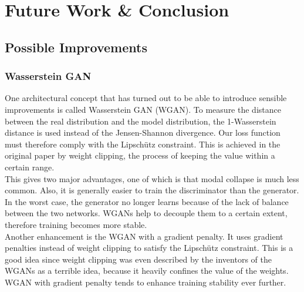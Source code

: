 \section{Future Work \& Conclusion}

	\subsection{Possible Improvements}
	
	\subsubsection{Wasserstein GAN}
	One architectural concept that has turned out to be able to introduce sensible improvements is called Wasserstein GAN (WGAN)\cite{arjovsky2017wasserstein}. To measure the distance between the real distribution and the model distribution, the 1-Wasserstein distance is used instead of the Jensen-Shannon divergence. Our loss function must therefore comply with the Lipschütz constraint. This is achieved in the original paper by weight clipping, the process of keeping the value within a certain range. \\
	This gives two major advantages, one of which is that modal collapse is much less common. Also, it is generally easier to train the discriminator than the generator. In the worst case, the generator no longer learns because of the lack of balance between the two networks. WGANs help to decouple them to a certain extent, therefore training becomes more stable. \\
	Another enhancement is the WGAN with a gradient penalty. It uses gradient penalties instead of weight clipping to satisfy the Lipschütz constraint. This is a good idea since weight clipping was even described by the inventors of the WGANs as a terrible idea\cite{arjovsky2017wasserstein}, because it heavily confines the value of the weights. WGAN with gradient penalty tends to enhance training stability ever further. \\
